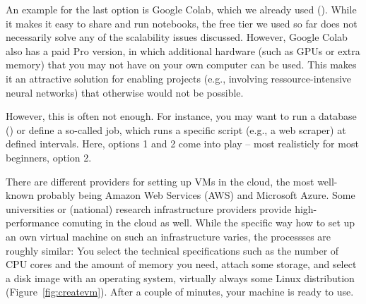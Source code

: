 An example for the last option is Google Colab, which we already used
(). While it makes it easy to share and run notebooks,
the free tier we used so far does not necessarily solve any of the
scalability issues discussed. However, Google Colab also has a paid Pro
version, in which additional hardware (such as GPUs or extra memory)
that you may not have on your own computer can be used. This makes
it an attractive solution for enabling projects (e.g., involving
ressource-intensive neural networks) that otherwise would not be possible.

However, this is often not enough. For instance, you may want to run
a database () or define a so-called  job,
which runs a specific script (e.g., a web scraper) at defined intervals.
Here, options 1 and 2 come into play -- most realisticly for most
beginners, option 2.

There are different providers for setting up VMs in the cloud, the
most well-known probably being Amazon Web Services (AWS) and
Microsoft Azure. Some universities or (national) research infrastructure
providers provide high-performance comuting in the cloud as well.
While the specific way how to set up an own virtual machine on
such an infrastructure varies, the processses are roughly similar:
You select the technical specifications such as the number of CPU
cores and the amount of memory you need, attach some storage, and
select a disk image with an operating system, virtually always some
Linux distribution (Figure~\ref{fig:createvm}).
After a couple of minutes, your machine is ready to use.

